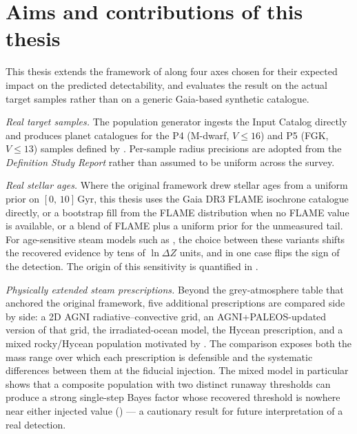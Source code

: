 \section{Aims and contributions of this thesis}
\label{sec:contributions}

This thesis extends the \HZIED framework of \textcite{Schlecker2024}
along four axes chosen for their expected impact on the predicted
detectability, and evaluates the result on the actual \PLATO target
samples rather than on a generic Gaia-based synthetic catalogue.

\emph{Real target samples.}  The population generator ingests the
\PLATO Input Catalog directly and produces planet catalogues for
the P4 (M-dwarf, $V\leq 16$) and P5 (FGK, $V\leq 13$) samples defined
by \textcite{Nascimbeni2022}.  Per-sample radius precisions are
adopted from the \PLATO \emph{Definition Study Report}
\parencite{ESA2017PLATO} rather than assumed to be uniform across
the survey.

\emph{Real stellar ages.}  Where the original framework drew stellar
ages from a uniform prior on $[0,\,10]\,\mathrm{Gyr}$, this thesis
uses the Gaia DR3 FLAME isochrone catalogue \parencite{GaiaDR3}
directly, or a bootstrap fill from the FLAME distribution when no
FLAME value is available, or a blend of FLAME plus a uniform prior
for the unmeasured tail.  For age-sensitive steam models such as
\textcite{Aguichine2021}, the choice between these variants shifts
the recovered evidence by tens of $\ln\Delta Z$ units, and in one
case flips the sign of the detection.  The origin of this
sensitivity is quantified in .

\emph{Physically extended steam prescriptions.}  Beyond the
\textcite{Turbet2020} grey-atmosphere table that anchored the
original framework, five additional prescriptions are compared side
by side: a 2D AGNI radiative--convective grid, an
AGNI+PALEOS-updated version of that grid, the
\textcite{Aguichine2021} irradiated-ocean model, the
\textcite{Pierrehumbert2022} Hycean prescription, and a mixed
rocky/Hycean population motivated by \textcite{Innes2023}.  The
comparison exposes both the mass range over which each prescription
is defensible and the systematic differences between them at the
fiducial injection.  The mixed model in particular shows that a
composite population with two distinct runaway thresholds can
produce a strong single-step Bayes factor whose recovered
threshold is nowhere near either injected value
() --- a cautionary result for future
interpretation of a real detection.

